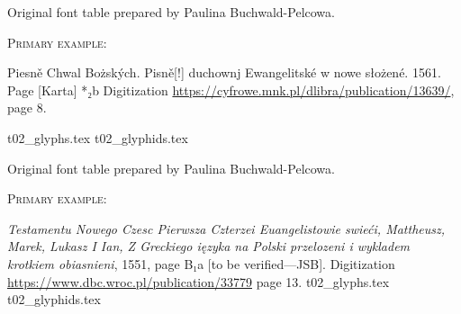 \documentclass[12pt]{article}
\newcommand{\bg}{\begingl}
\begin{document}
\newpage
  \begin{flushleft}
    \label{fig:t01}

    
    \medskip

      Original font table prepared by Paulina Buchwald-Pelcowa.

      \bigskip

      \textsc{Primary example:}

      Piesně Chwal Bożských. Pisně[!] duchownj Ewangelitské w nowe słożené.
1561.
      Page [Karta] *₂b
Digitization %
\url{https://cyfrowe.mnk.pl/dlibra/publication/13639/}, page 8.

 {t02_glyphs.tex}
 {t02_glyphids.tex}
\endgl \xe


\end{flushleft}

\newpage
  \begin{flushleft}
    \label{fig:t02}
    
    \medskip
    
      Original font table prepared by Paulina Buchwald-Pelcowa.

      \bigskip

        \textsc{Primary example:}

  \textit{Testamentu Nowego Czesc Pierwsza Czterzei Euangelistowie
    swieći, Mattheusz, Marek, Lukasz I Ian, Z Greckiego ięzyka na
    Polski przelozeni i wykladem krotkiem obiasnieni}, 1551, page
  {\Junicode B₁a} [to be verified---JSB].  Digitization
  \url{https://www.dbc.wroc.pl/publication/33779} page 13.
 {t02_glyphs.tex}
 {t02_glyphids.tex}
\endgl \xe

\end{flushleft}
\end{document}

